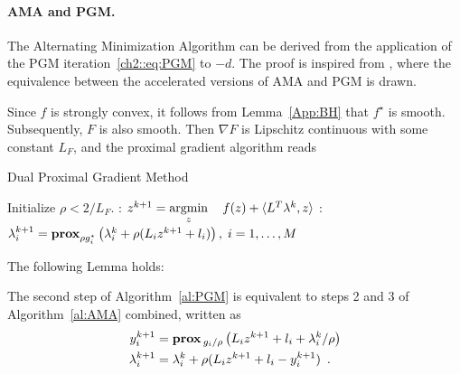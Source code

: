 \documentclass[openany]{now}
\newcommand{\argmin}{\mathop{\rm argmin}}
\newcommand{\prox}{\mathop{\bf prox}}
\begin{document}
\paragraph{AMA and PGM.}
The Alternating Minimization Algorithm can be derived from the application of the PGM iteration~\eqref{ch2::eq:PGM} to $-d$. The proof is inspired from \cite[Lemma~3.2]{beck2014fast}, where the equivalence between the accelerated versions of AMA and PGM is drawn.

Since $f$ is strongly convex, it follows from Lemma~\ref{App:BH} that $f^\star$ is smooth. Subsequently, $F$ is also smooth. Then $\nabla F$ is Lipschitz continuous with some constant $L_F$, and the proximal gradient algorithm reads
\begin{algorithm}[H]
\caption{Dual Proximal Gradient Method}
\label{al:PGM}
\begin{algorithmic} 
\REQUIRE Initialize $\rho < 2/L_F$.
\LOOP
{}: $z^{k+1} = \argmin\limits_z \quad f(z) + \langle  L^T\lambda^k, z\rangle $
: $\lambda_i^{k+1} = \prox_{\rho g_i^\star}\left(\lambda_i^k+\rho(L_iz^{k+1}+l_i)\right), \; i=1,\ldots,M$
\ENDLOOP
\end{algorithmic}
\end{algorithm}\begin{footnotesize}
\end{footnotesize}

The following Lemma holds:
\begin{lemma}{\label{App.:AMA_PGM}}
The second step of Algorithm~\ref{al:PGM}
is equivalent to steps 2 and 3 of Algorithm~\ref{al:AMA} combined, written as
\begin{align*}
 y_i^{k+1} &= \prox{_{g_i/\rho}}\left(L_iz^{k+1}+l_i+\lambda_i^k/\rho\right)\\
 \lambda_i^{k+1} &= \lambda_i^k + \rho(L_i z^{k+1} +l_i- y_i^{k+1})\enspace.
\end{align*}
\end{lemma}
\end{document}
